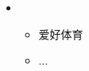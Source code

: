 \resheading{{\color{white}{ 个人陈述}} }
  \begin{itemize}[leftmargin=*]

    \item
      {\small
      \begin{itemize}
        \item 爱好体育
        \item ...
      \end{itemize}
      }  \end{itemize}
